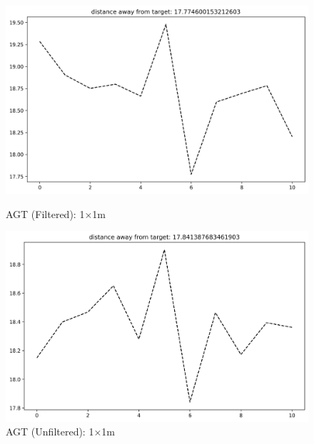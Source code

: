 \documentclass[runningheads]{llncs}
\begin{document}
\begin{figure}[H]
	\centering
	\begin{minipage}{0.49\textwidth}
		\centering
		\includegraphics[width=\textwidth]{figures/filtered/mlp_custom_1.png}
		\caption*{AGT (Filtered): 1×1m}
	\end{minipage}
	\hfill
	\begin{minipage}{0.49\textwidth}
		\centering
		\includegraphics[width=\textwidth]{figures/unfiltered/mlp_custom_1.png}
		\caption*{AGT (Unfiltered): 1×1m}
	\end{minipage}
\end{figure}
\end{document}
